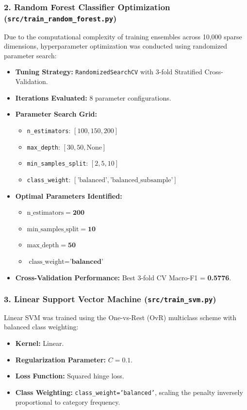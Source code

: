 \subsubsection*{2. Random Forest Classifier Optimization (\texttt{src/train\_random\_forest.py})}
Due to the computational complexity of training ensembles across 10,000 sparse dimensions, hyperparameter optimization was conducted using randomized parameter search:
\begin{itemize}
    \item \textbf{Tuning Strategy:} \texttt{RandomizedSearchCV} with 3-fold Stratified Cross-Validation.
    \item \textbf{Iterations Evaluated:} 8 parameter configurations.
    \item \textbf{Parameter Search Grid:}
    \begin{itemize}
        \item \texttt{n\_estimators}: $[100, 150, 200]$
        \item \texttt{max\_depth}: $[30, 50, \text{None}]$
        \item \texttt{min\_samples\_split}: $[2, 5, 10]$
        \item \texttt{class\_weight}: $[\text{'balanced'}, \text{'balanced\_subsample'}]$
    \end{itemize}
    \item \textbf{Optimal Parameters Identified:}
    \begin{itemize}
        \item $\text{n\_estimators} = \mathbf{200}$
        \item $\text{min\_samples\_split} = \mathbf{10}$
        \item $\text{max\_depth} = \mathbf{50}$
        \item $\text{class\_weight} = \mathbf{\text{'balanced'}}$
    \end{itemize}
    \item \textbf{Cross-Validation Performance:} Best 3-fold CV Macro-F1 = \textbf{0.5776}.
\end{itemize}

\subsubsection*{3. Linear Support Vector Machine (\texttt{src/train\_svm.py})}
Linear SVM was trained using the One-vs-Rest (OvR) multiclass scheme with balanced class weighting:
\begin{itemize}
    \item \textbf{Kernel:} Linear.
    \item \textbf{Regularization Parameter:} $C = 0.1$.
    \item \textbf{Loss Function:} Squared hinge loss.
    \item \textbf{Class Weighting:} \texttt{class\_weight='balanced'}, scaling the penalty inversely proportional to category frequency.
\end{itemize}


